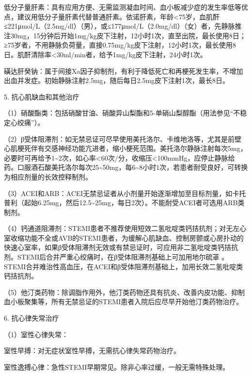低分子量肝素：具有应用方便、无需监测凝血时间、血小板减少症的发生率低等优点，建议用低分子量肝素代替普通肝素。依诺肝素，年龄\textless{}75岁，血肌酐≤221μmol/L（2.5mg/dl）（男），或≤177μmol/L（2.0mg/dl）（女）者，先静脉推注30mg，15分钟后开始1mg/kg皮下注射，12小时1次，直至出院，最长使用8日；≥75岁者，不用静脉负荷量，直接0.75mg/kg皮下注射，12小时1次，最长使用8日。肌酐清除率\textless{}30ml/min者，给予1mg/kg皮下注射，24小时1次。

磺达肝癸钠：属于间接Xa因子抑制剂，有利于降低死亡和再梗死发生率，不增加出血并发症。初始静脉注射2.5mg，随后每日2.5mg皮下注射1次，最长8日。

5. 抗心肌缺血和其他治疗

（1）硝酸酯类：包括硝酸甘油、硝酸异山梨酯和5-单硝山梨醇酯（用法参见“不稳定心绞痛”）。

（2）β受体阻滞剂：如无禁忌证可尽早使用美托洛尔、卡维地洛等，尤其是前壁心肌梗死伴有交感神经功能亢进者，缩小梗死范围。美托洛尔静脉注射每次5mg，必要时可再给予1\textasciitilde{}2次，如心率\textless{}60次/分，收缩压\textless{}100mmHg，应停止静脉给药。口服酒石酸美托洛尔每次25\textasciitilde{}50mg，每6\textasciitilde{}8小时1次，若患者耐受良好，可转换为相应剂量的长效控释制剂。

（3）ACEI和ARB：ACEI无禁忌证者从小剂量开始逐渐增加至目标剂量，如卡托普利（起始6.25mg，然后12.5\textasciitilde{}25mg，每日2次）。不能耐受ACEI者可选用ARB类制剂。

（4）钙通道阻滞剂：STEMI患者不推荐使用短效二氢吡啶类钙拮抗剂；对无左心室收缩功能不全或AVB的STEMI患者，为缓解心肌缺血、控制房颤或心房扑动的快速心室率，如果β受体阻滞剂无效或有禁忌证时，可应用非二氢吡啶类钙拮抗剂。STEMI后合并严重心绞痛时，在β受体阻滞剂基础上可加用地尔硫䓬
。STEMI合并难治性高血压，在ACEI和β受体阻滞剂基础上，加用长效二氢吡啶类钙拮抗剂。

（5）他汀类药物：除调脂作用外，他汀类药物还具有抗炎、改善内皮功能、抑制血小板聚集等，所有无禁忌证的STEMI患者入院后应尽早开始他汀类药物治疗。

6. 抗心律失常治疗

（1）室性心律失常：

室性早搏：对无症状室性早搏，无需抗心律失常药物治疗。

室性逸搏心律：急性STEMI早期常见。除非心率过缓，一般无需特殊处理。

